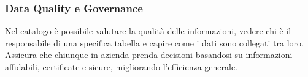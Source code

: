 \subsubsection{Data Quality e Governance}
Nel catalogo è possibile valutare la qualità delle informazioni, vedere chi è il responsabile di una specifica tabella e capire come i dati sono collegati tra loro. 
Assicura che chiunque in azienda prenda decisioni basandosi su informazioni affidabili, certificate e sicure, migliorando l'efficienza generale.







